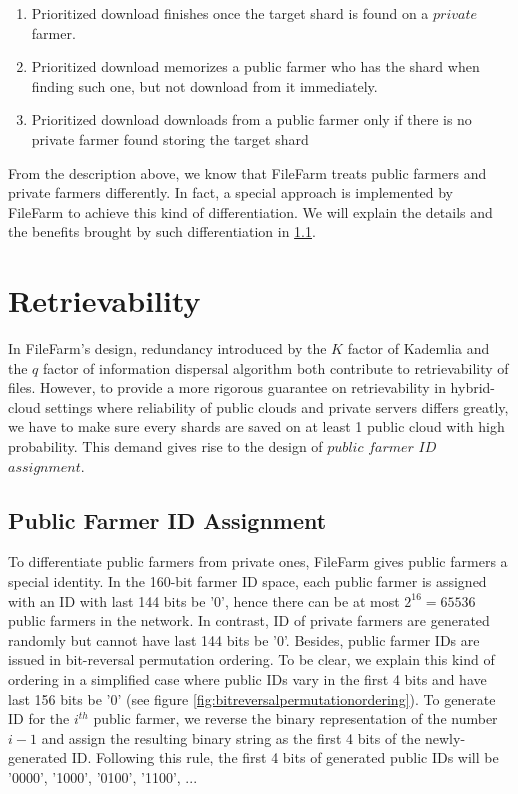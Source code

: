 \begin{enumerate}
  \item Prioritized download finishes once the target shard is found on a $private$ farmer.
  \item Prioritized download memorizes a public farmer who has the shard when finding such one, but not download from it immediately.
  \item Prioritized download downloads from a public farmer only if there is no private farmer found storing the target shard
\end{enumerate}

From the description above, we know that FileFarm treats public farmers and private farmers differently. In fact, a special approach is implemented by FileFarm to achieve this kind of differentiation. We will explain the details and the benefits brought by such differentiation in \ref{ss:publicfarmeridassignment}.

\section{Retrievability}
\label{s:retrievability}

In FileFarm's design, redundancy introduced by the $K$ factor of Kademlia and the $q$ factor of information dispersal algorithm both contribute to retrievability of files. However, to provide a more rigorous guarantee on retrievability in hybrid-cloud settings where reliability of public clouds and private servers differs greatly, we have to make sure every shards are saved on at least 1 public cloud with high probability. This demand gives rise to the design of $public$ $farmer$ $ID$ $assignment$.

\subsection{Public Farmer ID Assignment}
\label{ss:publicfarmeridassignment}

To differentiate public farmers from private ones, FileFarm gives public farmers a special identity. In the 160-bit farmer ID space, each public farmer is assigned with an ID with last 144 bits be '0', hence there can be at most $2^{16}=65536$ public farmers in the network. In contrast, ID of private farmers are generated randomly but cannot have last 144 bits be '0'. Besides, public farmer IDs are issued in bit-reversal permutation ordering. To be clear, we explain this kind of ordering in a simplified case where public IDs vary in the first 4 bits and have last 156 bits be '0' (see figure \ref{fig:bitreversalpermutationordering}). To generate ID for the $i^{th}$ public farmer, we reverse the binary representation of the number $i-1$ and assign the resulting binary string as the first 4 bits of the newly-generated ID. Following this rule, the first 4 bits of generated public IDs will be '0000', '1000', '0100', '1100', ...

